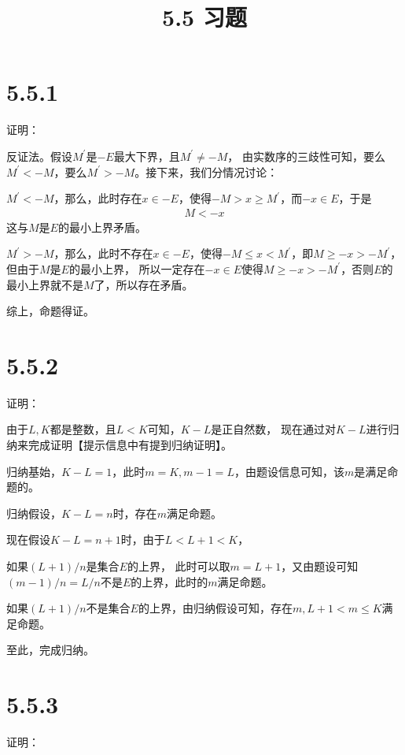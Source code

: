 \documentclass{article}
\theoremstyle{mystyle}
\begin{document}
\title{5.5 习题}
\maketitle

\section*{5.5.1}

证明：

反证法。假设$M^\prime$是$-E$最大下界，且$M^\prime \neq -M$，
由实数序的三歧性可知，要么$M^\prime < -M$，要么$M^\prime > -M$。接下来，我们分情况讨论：

$M^\prime < -M$，那么，此时存在$x \in -E$，使得$-M > x \geq M^\prime$，而$-x \in E$，于是
  \begin{align*}
    M < -x
  \end{align*}
  这与$M$是$E$的最小上界矛盾。

$M^\prime > -M$，那么，此时不存在$x \in -E$，使得$-M \leq x < M^\prime$，即$M \geq -x > -M^\prime$，但由于$M$是$E$的最小上界，
  所以一定存在$-x \in E$使得$M \geq -x > -M^\prime$，否则$E$的最小上界就不是$M$了，所以存在矛盾。


  综上，命题得证。

  \section*{5.5.2}

  证明：

  由于$L,K$都是整数，且$L < K$可知，$K - L$是正自然数，
  现在通过对$K - L$进行归纳来完成证明【提示信息中有提到归纳证明】。

  归纳基始，$K-L=1$，此时$m=K,m-1=L$，由题设信息可知，该$m$是满足命题的。

  归纳假设，$K-L=n$时，存在$m$满足命题。

  现在假设$K-L=n+1$时，由于$L < L + 1 < K$，

  如果$(L + 1)/n$是集合$E$的上界，
  此时可以取$m=L+1$，又由题设可知$(m-1)/n=L/n$不是$E$的上界，此时的$m$满足命题。

  如果$(L + 1)/n$不是集合$E$的上界，由归纳假设可知，存在$m, L+1 < m \leq K$满足命题。

  至此，完成归纳。

  \section*{5.5.3}

  证明：
\end{document}
